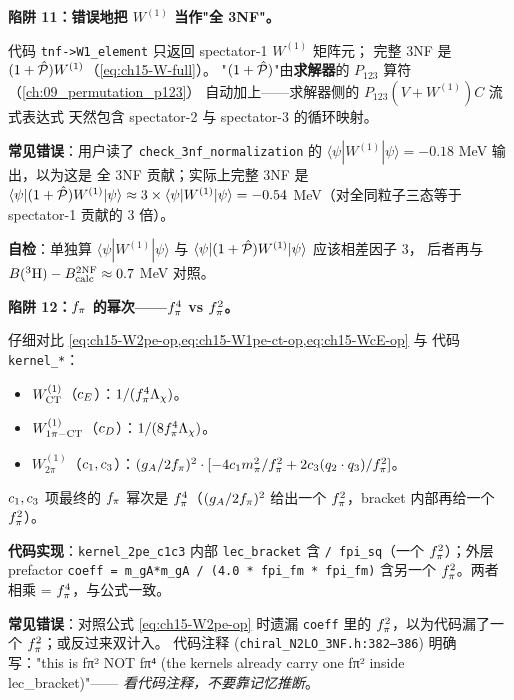 \begin{pitfallbox}[label={pit:ch15-ctot-symmetry}]
\textbf{陷阱 11：错误地把 \(W^{(1)}\) 当作"全 3NF"。}

代码 \texttt{tnf->W1\_element} 只返回 spectator-1 \(W^{(1)}\) 矩阵元；
完整 3NF 是 \((1 + \hat{\mathcal{P}}) W^{(1)}\)（\cref{eq:ch15-W-full}）。
"\((1 + \hat{\mathcal{P}})\)"由\textbf{求解器}的 \(P_{123}\) 算符（\cref{ch:09_permutation_p123}）
自动加上——求解器侧的 \(P_{123} (V + W^{(1)}) C\) 流式表达式
天然包含 spectator-2 与 spectator-3 的循环映射。

\textbf{常见错误}：用户读了 \texttt{check\_3nf\_normalization} 的
\(\langle \psi | W^{(1)} | \psi \rangle = -0.18\) MeV 输出，以为这是
全 3NF 贡献；实际上完整 3NF 是 \(\langle \psi | (1 + \hat{\mathcal{P}}) W^{(1)} | \psi
\rangle \approx 3 \times \langle \psi | W^{(1)} | \psi \rangle = -0.54\)
MeV（对全同粒子三态等于 spectator-1 贡献的 3 倍）。

\textbf{自检}：单独算 \(\langle \psi | W^{(1)} | \psi \rangle\) 与
\(\langle \psi | (1 + \hat{\mathcal{P}}) W^{(1)} | \psi \rangle\) 应该相差因子 3，
后者再与 \(B(^3{\rm H}) - B^{\rm 2NF}_{\rm calc} \approx 0.7\) MeV 对照。
\end{pitfallbox}

\begin{pitfallbox}[label={pit:ch15-c1c3-fpi-power}]
\textbf{陷阱 12：\(f_\pi\) 的幂次——\(f_\pi^4\) vs \(f_\pi^2\)。}

仔细对比 \cref{eq:ch15-W2pe-op,eq:ch15-W1pe-ct-op,eq:ch15-WcE-op} 与
代码 \texttt{kernel\_*}：
\begin{itemize}
\item \(W^{(1)}_{\rm CT}\)（\(c_E\)）：\(1/(f_\pi^4 \Lambda_\chi)\)。
\item \(W^{(1)}_{1\pi-{\rm CT}}\)（\(c_D\)）：\(1/(8 f_\pi^4 \Lambda_\chi)\)。
\item \(W^{(1)}_{2\pi}\)（\(c_1, c_3\)）：\((g_A/2f_\pi)^2 \cdot
      [-4c_1 m_\pi^2/f_\pi^2 + 2c_3 (q_2 \cdot q_3)/f_\pi^2]\)。
\end{itemize}
\(c_1, c_3\) 项最终的 \(f_\pi\) 幂次是 \(f_\pi^4\)（\((g_A/2f_\pi)^2\)
给出一个 \(f_\pi^2\)，bracket 内部再给一个 \(f_\pi^2\)）。

\textbf{代码实现}：\texttt{kernel\_2pe\_c1c3} 内部 \texttt{lec\_bracket}
含 \texttt{/ fpi\_sq}（一个 \(f_\pi^2\)）；外层 prefactor \texttt{coeff =
m\_gA*m\_gA / (4.0 * fpi\_fm * fpi\_fm)} 含另一个 \(f_\pi^2\)。两者
相乘 = \(f_\pi^4\)，与公式一致。

\textbf{常见错误}：对照公式 \cref{eq:ch15-W2pe-op} 时遗漏 \texttt{coeff}
里的 \(f_\pi^2\)，以为代码漏了一个 \(f_\pi^2\)；或反过来双计入。
代码注释 (\texttt{chiral\_N2LO\_3NF.h:382--386}) 明确写："this is fπ² NOT
fπ⁴ (the kernels already carry one fπ² inside lec\_bracket)"——
\emph{看代码注释，不要靠记忆推断}。
\end{pitfallbox}


